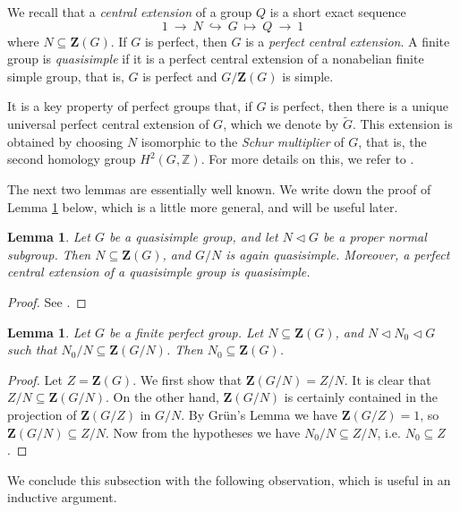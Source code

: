 \documentclass{daj}
\newtheorem{lemma}[theorem]{Lemma}
\theoremstyle{definition}
\theoremstyle{remark}
\newcommand{\Z}{\mathbf{Z}}
\begin{document}
We recall that a {\itshape central extension} of a group $Q$ is a short exact sequence
$$ 1 \> \to \> N \> \hookrightarrow \> G \> \mapsto \> Q \> \to \> 1 $$
where $N \subseteq \Z(G)$.
If $G$ is perfect, then $G$ is a {\itshape perfect central extension}.
A finite group is {\itshape quasisimple} if it is a perfect central extension of a nonabelian finite simple group,
that is, $G$ is perfect and $G/\Z(G)$ is simple.

It is a key property of perfect groups that, if $G$ is perfect,
then there is a unique universal perfect central extension of $G$, which we denote by $\widetilde{G}$.
This extension is obtained by choosing $N$ isomorphic to the {\itshape Schur multiplier} of $G$,
that is, the second homology group $H^2(G,\mathbb{Z})$. For more details on this, we refer to \cite[Sec. 33]{Asc00}.

The next two lemmas are essentially well known.
We write down the proof of Lemma \ref{lemExtQuasi} below,
which is a little more general, and will be useful later.
 
\begin{lemma} \label{lemNQuasi} 
Let $G$ be a quasisimple group, and let $N \lhd G$ be a proper normal subgroup.
Then $N \subseteq \Z(G)$, and $G/N$ is again quasisimple.
Moreover, a perfect central extension of a quasisimple group is quasisimple.
\end{lemma}
\begin{proof} 
	See \cite[(31.2) and (33.5)]{Asc00}.
\end{proof} 

\begin{lemma} \label{lemExtQuasi}
Let $G$ be a finite perfect group.
Let $N \subseteq \Z(G)$, and $N \lhd N_0 \lhd G$ such that $N_0/N \subseteq \Z(G/N)$.
Then $N_0 \subseteq \Z(G)$.
\end{lemma}
\begin{proof}
Let $Z=\Z(G)$.
We first show that $\Z(G/N) = Z/N$. It is clear that $Z/N \subseteq \Z(G/N)$.
On the other hand, $\Z(G/N)$ is certainly contained in the projection of $\Z(G/Z)$ in $G/N$.
By Gr\"{u}n's Lemma \cite{Gru36} we have $\Z(G/Z)=1$, so $\Z(G/N) \subseteq Z/N$.
Now from the hypotheses we have $N_0/N \subseteq Z/N$, i.e. $N_0 \subseteq Z$.
\end{proof}

We conclude this subsection with the following observation,
which is useful in an inductive argument. 
\end{document}

